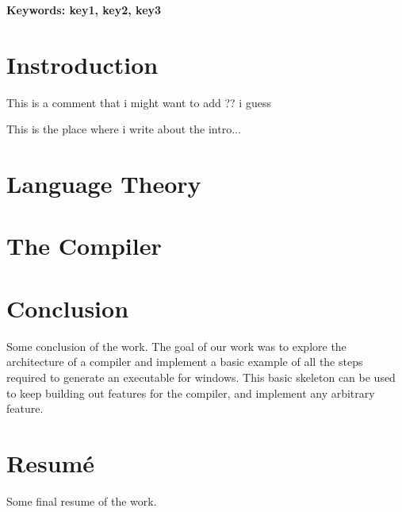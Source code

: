 \documentclass[a4paper,oneside,onecolumn,12pt]{LegrandOrangeBook}
\begin{document}
\textbf{Keywords: key1, key2, key3}

\chapter*{Instroduction}
\begin{eBox}
    This is a comment that i might want to add ?? i guess
\end{eBox}
This is the place where i write about the intro...


\chapter{Language Theory}

\chapter{The Compiler}

\chapter*{Conclusion}
Some conclusion of the work.
The goal of our work was to explore the architecture of a compiler and implement a basic example of all the steps required to generate an executable for windows. This basic skeleton can be used to keep building out features for the compiler, and implement any arbitrary feature.

\pagebreak

\chapter*{Resumé}
Some final resume of the work.


\pagebreak
\thispagestyle{empty}

\mbox{}
\vfill

\end{document}
